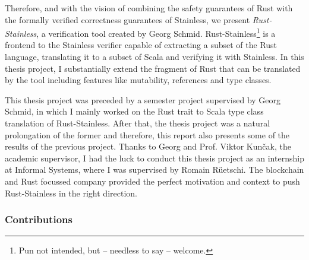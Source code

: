 Therefore, and with the vision of combining the safety guarantees of Rust with
the formally verified correctness guarantees of Stainless, we present
\emph{Rust-Stainless}, a verification tool created by Georg Schmid.
Rust-Stainless\footnote{Pun not intended, but -- needless to say -- welcome.} is
a frontend to the Stainless verifier capable of extracting a subset of the Rust
language, translating it to a subset of Scala and verifying it with Stainless.
In this thesis project, I substantially extend the fragment of Rust that can be
translated by the tool including features like mutability, references and type
classes. \newpage

This thesis project was preceded by a semester project supervised by Georg
Schmid, in which I  mainly worked on the Rust trait to Scala type class
translation of Rust-Stainless. After that, the thesis project was a natural
prolongation of the former and therefore, this report also presents some of the
results of the previous project. Thanks to Georg and Prof. Viktor Kun\v{c}ak,
the academic supervisor, I had the luck to conduct this thesis project as an
internship at Informal Systems, where I was supervised by Romain Rüetschi. The
blockchain and Rust focussed company provided the perfect motivation and
context to push Rust-Stainless in the right direction.

\subsubsection{Contributions}

